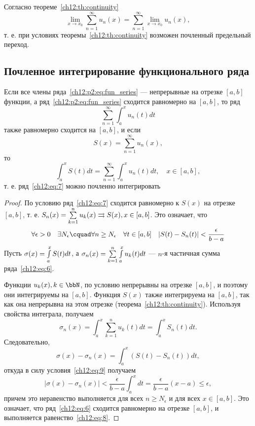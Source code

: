 \begin{cons}
	Согласно теореме~\eqref{ch12:th:continuity}
	$$
		\lim_{x \to x_0} \sum_{n = 1}^{\infty} u_n(x) = \sum_{n = 1}^{\infty} \lim_{x \to x_0} u_n(x),
	$$
	т. е. при условиях теоремы~\eqref{ch12:th:continuity} возможен почленный предельный переход.
\end{cons}

\subsection{Почленное интегрирование функционального ряда}

\begin{thm}
	\label{ch12:th:integration}
	Если все члены ряда~\eqref{ch12:p2:eq:fun_series} --- непрерывные на отрезке $[a, b]$ функции,
	а ряд~\eqref{ch12:p2:eq:fun_series} сходится равномерно на $[a, b]$, то ряд
	\begin{equation}
		\label{ch12:eq:6}
		\sum_{n=1}^{\infty} \int_a^x u_n(t)dt
	\end{equation}
	также равномерно сходится на $[a, b]$, и если
	\begin{equation}
		\label{ch12:eq:7}
		S(x) = \sum_{n=1}^{\infty} u_n(x),
	\end{equation}
	то
	\begin{equation}
		\label{ch12:eq:8}
		\int_a^x S(t)dt = \sum_{n=1}^{\infty} \int_a^x u_n(t)dt, \quad x \in [a, b],
	\end{equation}
	т. е. ряд~\eqref{ch12:eq:7} можно почленно интегрировать
\end{thm}
\begin{proof}
	По условию ряд~\eqref{ch12:eq:7} сходится равномерно к $S(x)$ на отрезке $[a, b]$,
	т. е. $S_n(x) = \sum_{k=1}^{n}\limits u_k(x) \rightrightarrows S(x), x \in [a, b]$.
	Это означает, что
	\begin{equation}
		\label{ch12:eq:9}
		\forall \epsilon > 0 \quad \exists N_{\epsilon} \cquad \forall n \ge N_{\epsilon} \quad
			\forall t \in [a, b] \quad |S(t) - S_n(t)| < \frac{\epsilon}{b - a}
	\end{equation}
	Пусть $\sigma(x) = \int_a^x\limits S(t)dt$, а $\sigma_n(x) = \sum_{k=1}^n\limits \int_a^x\limits u_k(t)dt$ ---
	$n$-я частичная сумма ряда~\eqref{ch12:eq:6}.

	Функции $u_k(x), k \in \bbN$, по условию непрерывны на отрезке $[a, b]$, и поэтому
	они интегрируемы на $[a, b]$. Функция $S(x)$ также интегрируема на $[a, b]$, так как
	она непрерывна на этом отрезке (теорема~\ref{ch12:th:continuity}).
	Используя свойства интеграла, получаем
	$$
		\sigma_n(x) = \int_a^x \sum_{k=1}^n u_k(t)dt = \int_a^x S_n(t)dt.
	$$
	Следовательно,
	$$
		\sigma(x) - \sigma_n(x) = \int_a^x (S(t) - S_n(t))dt,
	$$
	откуда в силу условия~\eqref{ch12:eq:9} получаем
	$$
		|\sigma(x) - \sigma_n(x)| < \frac{\epsilon}{b - a} \int_a^x dt = \frac{\epsilon}{b - a} (x - a) \le \epsilon,
	$$
	причем это неравенство выполняется для всех $n \ge N_{\epsilon}$ и для всех $x \in [a, b]$.
	Это означает, что ряд~\eqref{ch12:eq:6} сходится равномерно на отрезке $[a, b]$,
	и выполняется равенство~\eqref{ch12:eq:8}.
\end{proof}

